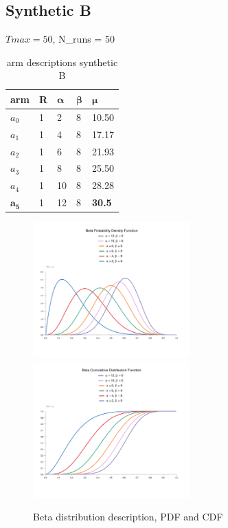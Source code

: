 \subsection{Synthetic B}
$Tmax = 50$,
N\_runs = 50
\begin{table}[H]
	\centering
	\caption{arm descriptions synthetic B}
	\begin{tabular}{|l||l|l|l|l|} 
		\hline
		\textbf{arm} & \textbf{R} & $\boldsymbol{\alpha}$ & $\boldsymbol{\beta}$ & $\boldsymbol{\mu}$  \\ 
		\hline
		$a_0$     & 1          & 2        & 8       & 10.50                    \\ 
		\hline
		$a_1$     & 1          & 4        & 8       & 17.17                      \\ 
		\hline
		$a_2$     & 1          & 6        & 8       & 21.93                    \\ 
		\hline
		$a_3$     & 1          & 8        & 8       & 25.50                     \\ 
		\hline
		$a_4$     & 1          & 10        & 8       & 28.28                   \\ 
		\hline
		$\boldsymbol{a_5}$     & 1          & 12        & 8       & \textbf{30.5}                     \\                 
		\hline
	\end{tabular}
\end{table}
\begin{figure}
	\centering
	\includegraphics[width=6cm]{./images/chart (1)-1.png}\quad\includegraphics[width=6cm]{./images/chart (2)-1.png}
	\caption{Beta distribution description, PDF and CDF}
	\label{beta}
\end{figure}

